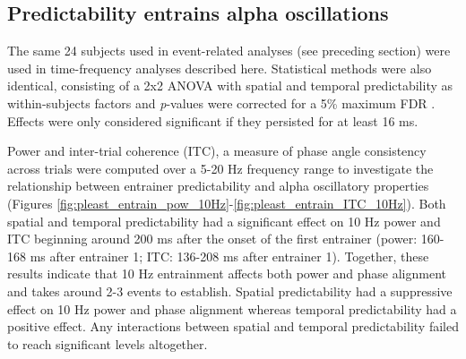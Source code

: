 \documentclass[dwyatte_dissertation.tex]{subfiles}
\begin{document}
\subsection{Predictability entrains alpha oscillations}
The same 24 subjects used in event-related analyses (see preceding section) were used in time-frequency analyses described here. Statistical methods were also identical, consisting of a 2x2 ANOVA with spatial and temporal predictability as within-subjects factors and \textit{p}-values were corrected for a 5\% maximum FDR \cite{BenjaminiYekutieli01}. Effects were only considered significant if they persisted for at least 16 ms.

Power and inter-trial coherence (ITC), a measure of phase angle consistency across trials \cite{LachauxRodriguezMartinerieEtAl99} were computed over a 5-20 Hz frequency range to investigate the relationship between entrainer predictability and alpha oscillatory properties (Figures \ref{fig:pleast_entrain_pow_10Hz}-\ref{fig:pleast_entrain_ITC_10Hz}). Both spatial and temporal predictability had a significant effect on 10 Hz power and ITC beginning around 200 ms after the onset of the first entrainer (power: 160-168 ms after entrainer 1; ITC: 136-208 ms after entrainer 1). Together, these results indicate that 10 Hz entrainment affects both power and phase alignment and takes around 2-3 events to establish. Spatial predictability had a suppressive effect on 10 Hz power and phase alignment whereas temporal predictability had a positive effect. Any interactions between spatial and temporal predictability failed to reach significant levels altogether.
\end{document}
